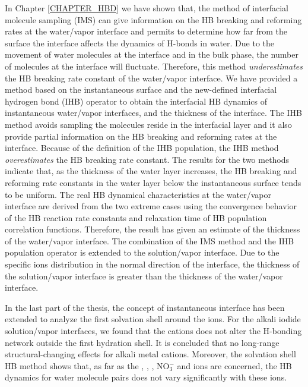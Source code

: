 In Chapter \ref{CHAPTER_HBD} we have shown that,
the method of interfacial molecule sampling (IMS) can give information on the HB breaking and reforming
rates at the water/vapor interface and permits to determine how far from the surface the interface affects the dynamics of H-bonds in water. 
Due to the movement of water molecules at the interface and in the bulk phase, the number of molecules at the interface will fluctuate.
Therefore, this method \emph{underestimates} the HB breaking rate constant of the water/vapor interface. 
We have provided a method based on the {instantaneous} surface and the new-defined
interfacial hydrogen bond (IHB) operator to obtain the interfacial HB dynamics of instantaneous water/vapor interfaces, and the thickness of the interface.  
The IHB method avoids sampling the molecules reside in the interfacial layer and
it also provide partial information on the HB breaking and reforming rates at the interface. 
Because of the definition of the IHB population, the IHB method \emph{overestimates} the HB breaking rate constant. 
The results for the two methods indicate that,
as the thickness of the water layer increases,
the HB breaking and reforming rate constants in the water layer {below} the instantaneous surface tends to be uniform. 
The real HB dynamical characteristics at the water/vapor interface 
are derived from the two extreme cases using the convergence behavior of the HB reaction rate constants and relaxation time 
of HB population correlation functions. 
Therefore, the result has given an estimate of the thickness of the water/vapor interface.  
The combination of the IMS method and the IHB population operator is extended to the solution/vapor interface. 
Due to the specific ions distribution in the normal direction of the interface,
the thickness of the solution/vapor interface is greater than the thickness of the water/vapor interface. 

In the last part of the thesis, the concept of instantaneous interface has been extended to analyze the first solvation shell around the ions.
For the alkali iodide solution/vapor interfaces, we found 
that the cations does not alter the H-bonding network outside the first hydration shell. 
It is concluded that no long-range structural-changing effects for alkali metal cations.
Moreover, the solvation shell HB method shows that, 
as far as the \Li, \Na, \K, NO$^-_3$ and \I ions are concerned, 
the HB dynamics for water molecule pairs does not vary significantly with these ions.

